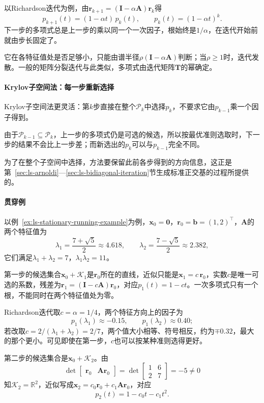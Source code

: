 以Richardson迭代为例，由$\bm r_{k+1}=(\bm I-\alpha\bm A)\bm r_k$得
\begin{equation}
 p_{k+1}(t)=(1-\alpha t)\,p_k(t),\qquad p_k(t)=(1-\alpha t)^k .
 \label{eq:ls-krylov-richardson-polynomial}
\end{equation}
下一步的多项式总是上一步的乘以同一个一次因子，根始终是$1/\alpha$，在迭代开始前就由步长固定了。

它在各特征值处是否足够小，只能由谱半径$\rho(\bm I-\alpha\bm A)$判断；当$\rho\geq1$时，迭代发散。一般的矩阵分裂迭代与此类似，多项式由迭代矩阵$\bm T$的幂确定。

\paragraph{Krylov子空间法：每一步重新选择}
Krylov子空间法更灵活：第$k$步直接在整个$\mathcal P_k$中选择$p_k$，不要求它由$p_{k-1}$乘一个因子得到。

由于$\mathcal P_{k-1}\subseteq\mathcal P_k$，上一步的多项式仍是可选的候选，所以按最优准则选取时，下一步的结果不会比上一步差；而新选出的$p_k$可以与$p_{k-1}$完全不同。

为了在整个子空间中选择，方法要保留此前各步得到的方向信息，这正是第~\ref{sec:ls-arnoldi}—\ref{sec:ls-bidiagonal-iteration}节生成标准正交基的过程所提供的。

\paragraph{贯穿例}
以例~\ref{ex:ls-stationary-running-example}为例，$\bm x_0=\bm 0$，$\bm r_0=\bm b=(1,2)^\top$，$\bm A$的两个特征值为
\[
 \lambda_1=\frac{7+\sqrt5}{2}\approx4.618,\qquad \lambda_2=\frac{7-\sqrt5}{2}\approx2.382 ,
\]
它们满足$\lambda_1+\lambda_2=7$，$\lambda_1\lambda_2=11$。

第一步的候选集合$\bm x_0+\mathcal K_1$是$\bm r_0$所在的直线，近似只能是$\bm x_1=c\,\bm r_0$，实数$c$是唯一可选的系数，残差为$\bm r_1=(\bm I-c\bm A)\bm r_0$，对应$p_1(t)=1-ct$。一次多项式只有一个根，不能同时在两个特征值处为零。

Richardson迭代取$c=\alpha=1/4$，两个特征方向上的因子为
\[
 p_1(\lambda_1)\approx-0.15,\qquad p_1(\lambda_2)\approx0.40 ;
\]
若改取$c=2/(\lambda_1+\lambda_2)=2/7$，两个值大小相等、符号相反，约为$\mp0.32$，最大的那个更小。可见即使在第一步，$c$也可以按某种准则选得更好。

第二步的候选集合是$\bm x_0+\mathcal K_2$。由
\[
 \det\begin{bmatrix}\bm r_0&\bm A\bm r_0\end{bmatrix}=\det\begin{bmatrix}1&6\\2&7\end{bmatrix}=-5\neq0
\]
知$\mathcal K_2=\mathbb R^2$，近似写成$\bm x_2=c_0\bm r_0+c_1\bm A\bm r_0$，对应
\[
  p_2(t)=1-c_0t-c_1t^2 .
\]

